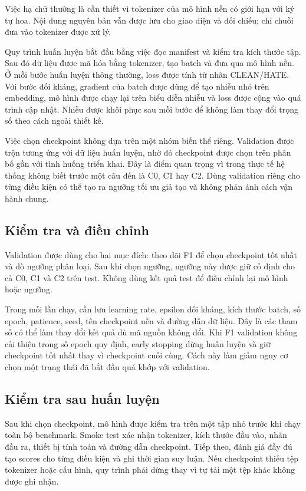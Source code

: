\documentclass[12pt,a4paper]{article}
\begin{document}
Việc hạ chữ thường là cần thiết vì tokenizer của mô hình nền có giới hạn với ký tự hoa. Nội dung nguyên bản vẫn được lưu cho giao diện và đối chiếu; chỉ chuỗi đưa vào tokenizer được xử lý.

Quy trình huấn luyện bắt đầu bằng việc đọc manifest và kiểm tra kích thước tập. Sau đó dữ liệu được mã hóa bằng tokenizer, tạo batch và đưa qua mô hình nền. Ở mỗi bước huấn luyện thông thường, loss được tính từ nhãn CLEAN/HATE. Với bước đối kháng, gradient của batch được dùng để tạo nhiễu nhỏ trên embedding, mô hình được chạy lại trên biểu diễn nhiễu và loss được cộng vào quá trình cập nhật. Nhiễu được khôi phục sau mỗi bước để không làm thay đổi trọng số theo cách ngoài thiết kế.

Việc chọn checkpoint không dựa trên một nhóm biến thể riêng. Validation được trộn tương ứng với dữ liệu huấn luyện, nhờ đó checkpoint được chọn trên phân bố gần với tình huống triển khai. Đây là điểm quan trọng vì trong thực tế hệ thống không biết trước một câu đến là C0, C1 hay C2. Dùng validation riêng cho từng điều kiện có thể tạo ra ngưỡng tối ưu giả tạo và không phản ánh cách vận hành chung.

\subsection{Kiểm tra và điều chỉnh}
Validation được dùng cho hai mục đích: theo dõi F1 để chọn checkpoint tốt nhất và dò ngưỡng phân loại. Sau khi chọn ngưỡng, ngưỡng này được giữ cố định cho cả C0, C1 và C2 trên test. Không dùng kết quả test để điều chỉnh lại mô hình hoặc ngưỡng.

Trong mỗi lần chạy, cần lưu learning rate, epsilon đối kháng, kích thước batch, số epoch, patience, seed, tên checkpoint nền và đường dẫn dữ liệu. Đây là các tham số có thể làm thay đổi kết quả dù mã nguồn không đổi. Khi F1 validation không cải thiện trong số epoch quy định, early stopping dừng huấn luyện và giữ checkpoint tốt nhất thay vì checkpoint cuối cùng. Cách này làm giảm nguy cơ chọn một trạng thái đã bắt đầu quá khớp với validation.

\subsection{Kiểm tra sau huấn luyện}
Sau khi chọn checkpoint, mô hình được kiểm tra trên một tập nhỏ trước khi chạy toàn bộ benchmark. Smoke test xác nhận tokenizer, kích thước đầu vào, nhãn đầu ra, thiết bị tính toán và đường dẫn checkpoint. Tiếp theo, đánh giá đầy đủ tạo scores cho từng điều kiện và ghi thời gian suy luận. Nếu checkpoint thiếu tệp tokenizer hoặc cấu hình, quy trình phải dừng thay vì tự tải một tệp khác không được ghi nhận.
\end{document}
